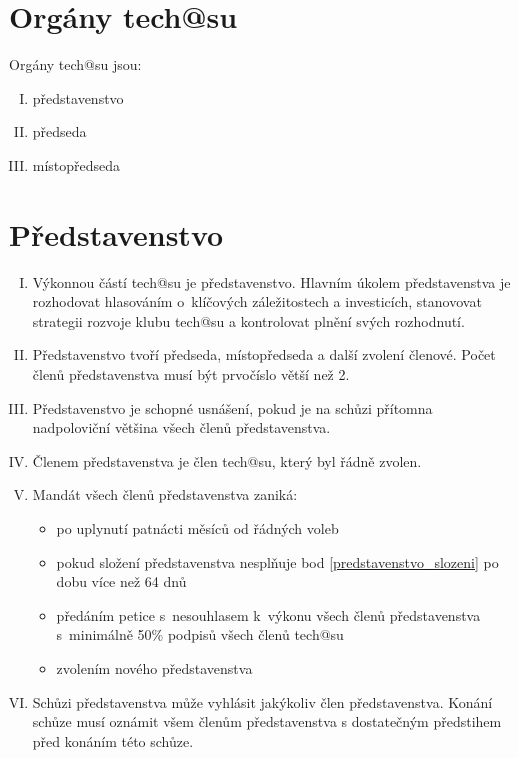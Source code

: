 \documentclass[10pt]{article}
\begin{document}
\section{Orgány tech@su} %
Orgány tech@su jsou:
	\begin{enumerate}[I.]
	\item představenstvo 
	\item předseda  
	\item místopředseda  
	\end{enumerate}

\section{Představenstvo} %
	\begin{enumerate}[I.]
	\item Výkonnou částí tech@su je představenstvo. Hlavním úkolem představenstva je rozhodovat hlasováním o~klíčových záležitostech a investicích, stanovovat strategii rozvoje klubu tech@su a kontrolovat plnění svých rozhodnutí. 
	\item \label{predstavenstvo_slozeni} Představenstvo tvoří předseda, místopředseda a další zvolení členové. Počet členů představenstva musí být prvočíslo větší než 2.
	\item Představenstvo je schopné usnášení, pokud je na schůzi přítomna nadpoloviční většina všech členů představenstva.
	\item Členem představenstva je člen tech@su, který byl řádně zvolen.
	\item Mandát všech členů představenstva zaniká:
	\begin{itemize}
		\item po uplynutí patnácti měsíců od řádných voleb
		\item pokud složení představenstva nesplňuje bod \ref{predstavenstvo_slozeni} po dobu více než 64 dnů
		\item předáním petice s~nesouhlasem k~výkonu všech členů představenstva s~minimálně 50\% podpisů všech členů tech@su
		\item zvolením nového představenstva
	\end{itemize}

	\item Schůzi představenstva může vyhlásit jakýkoliv člen představenstva. Konání schůze musí oznámit všem členům představenstva s dostatečným předstihem před konáním této schůze.



\end{enumerate}
\end{document}
